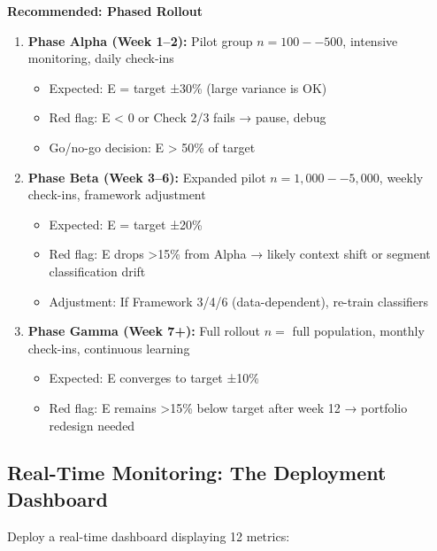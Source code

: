 \textbf{Recommended: Phased Rollout}

\begin{enumerate}
\item \textbf{Phase Alpha (Week 1--2):} Pilot group $n = 100--500$, intensive monitoring, daily check-ins
  \begin{itemize}[nosep]
  \item Expected: E = target ±30\% (large variance is OK)
  \item Red flag: E < 0 or Check 2/3 fails → pause, debug
  \item Go/no-go decision: E > 50\% of target
  \end{itemize}

\item \textbf{Phase Beta (Week 3--6):} Expanded pilot $n = 1,000--5,000$, weekly check-ins, framework adjustment
  \begin{itemize}[nosep]
  \item Expected: E = target ±20\%
  \item Red flag: E drops >15\% from Alpha → likely context shift or segment classification drift
  \item Adjustment: If Framework 3/4/6 (data-dependent), re-train classifiers
  \end{itemize}

\item \textbf{Phase Gamma (Week 7+):} Full rollout $n = $ full population, monthly check-ins, continuous learning
  \begin{itemize}[nosep]
  \item Expected: E converges to target ±10\%
  \item Red flag: E remains >15\% below target after week 12 → portfolio redesign needed
  \end{itemize}

\end{enumerate}

\subsection{Real-Time Monitoring: The Deployment Dashboard}

Deploy a real-time dashboard displaying 12 metrics:

